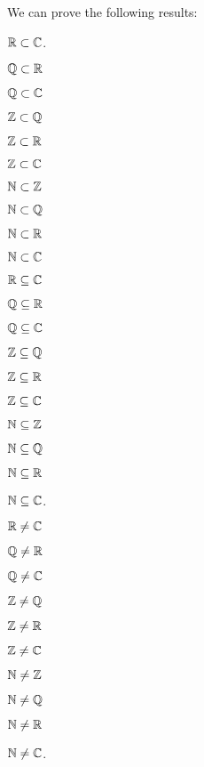 \documentclass{article}
\begin{document}
We can prove the following results:
\begin{thm}
\item\label{numbers:1} $\RR\properSubset\CC$.
\item\label{numbers:2} $\QQ\properSubset\RR$
\item\label{numbers:3} $\QQ\properSubset\CC$
\item\label{numbers:4} $\ZZ\properSubset\QQ$
\item\label{numbers:5} $\ZZ\properSubset\RR$
\item\label{numbers:6} $\ZZ\properSubset\CC$
\item\label{numbers:7} $\NN\properSubset\ZZ$
\item\label{numbers:8} $\NN\properSubset\QQ$
\item\label{numbers:9} $\NN\properSubset\RR$
\item\label{numbers:10} $\NN\properSubset\CC$
\item\label{numbers:11} $\mathbb{R}\subseteq\mathbb{C}$
\item\label{numbers:12} $\mathbb{Q}\subseteq\mathbb{R}$
\item\label{numbers:13} $\mathbb{Q}\subseteq\mathbb{C}$
\item\label{numbers:14} $\mathbb{Z}\subseteq\mathbb{Q}$
\item\label{numbers:15} $\mathbb{Z}\subseteq\mathbb{R}$
\item\label{numbers:16} $\mathbb{Z}\subseteq\mathbb{C}$
\item\label{numbers:17} $\mathbb{N}\subseteq\mathbb{Z}$
\item\label{numbers:18} $\mathbb{N}\subseteq\mathbb{Q}$
\item\label{numbers:19} $\mathbb{N}\subseteq\mathbb{R}$
\item\label{numbers:20} $\mathbb{N}\subseteq\mathbb{C}$.
\item\label{numbers:21} $\mathbb{R}\neq\mathbb{C}$
\item\label{numbers:22} $\mathbb{Q}\neq\mathbb{R}$
\item\label{numbers:23} $\mathbb{Q}\neq\mathbb{C}$
\item\label{numbers:24} $\mathbb{Z}\neq\mathbb{Q}$
\item\label{numbers:25} $\mathbb{Z}\neq\mathbb{R}$
\item\label{numbers:26} $\mathbb{Z}\neq\mathbb{C}$
\item\label{numbers:27} $\mathbb{N}\neq\mathbb{Z}$
\item\label{numbers:28} $\mathbb{N}\neq\mathbb{Q}$
\item\label{numbers:29} $\mathbb{N}\neq\mathbb{R}$
\item\label{numbers:30} $\mathbb{N}\neq\mathbb{C}$.
\end{thm}
\end{document}
